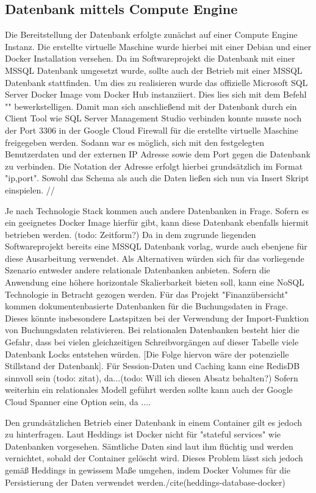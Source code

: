 \documentclass[pdftex,a4paper,abstracton,11pt,parskip=half,bibtotocnumbered]{scrartcl}
\begin{document}
	\subsection{Datenbank mittels Compute Engine}
		Die Bereitstellung der Datenbank erfolgte zunächst auf einer Compute Engine Instanz. Die erstellte virtuelle Maschine wurde hierbei mit einer Debian und einer Docker Installation versehen. Da im Softwareprojekt die Datenbank mit einer MSSQL Datenbank umgesetzt wurde, sollte auch der Betrieb mit einer MSSQL Datenbank stattfinden. Um dies zu realisieren wurde das offizielle Microsoft SQL Server Docker Image vom Docker Hub instanziiert. Dies lies sich mit dem Befehl "" bewerkstelligen. Damit man sich anschließend mit der Datenbank durch ein Client Tool wie SQL Server Management Studio verbinden konnte musste noch der Port 3306 in der Google Cloud Firewall für die erstellte virtuelle Maschine freigegeben werden. Sodann war es möglich, sich mit den festgelegten Benutzerdaten und der externen IP Adresse sowie dem Port gegen die Datenbank zu verbinden. Die Notation der Adresse erfolgt hierbei grundsätzlich im Format "ip,port". Sowohl das Schema als auch die Daten ließen sich nun via Insert Skript einspielen. //
		
		
		Je nach Technologie Stack kommen auch andere Datenbanken in Frage. Sofern es ein geeignetes Docker Image hierfür gibt, kann diese Datenbank ebenfalls hiermit betrieben werden. (todo: Zeitform?) Da in dem zugrunde liegenden Softwareprojekt bereits eine MSSQL Datenbank vorlag, wurde auch ebenjene für diese Ausarbeitung verwendet. Als Alternativen würden sich für das vorliegende Szenario entweder andere relationale Datenbanken anbieten. Sofern die Anwendung eine höhere horizontale Skalierbarkeit bieten soll, kann eine NoSQL Technologie in Betracht gezogen werden. Für das Projekt "Finanzübersicht" kommen dokumentenbasierte Datenbanken für die Buchungsdaten in Frage. Dieses könnte insbesondere Lastspitzen bei der Verwendung der Import-Funktion von Buchungsdaten relativieren. Bei relationalen Datenbanken besteht hier die Gefahr, dass bei vielen gleichzeitigen Schreibvorgängen auf dieser Tabelle viele Datenbank Locks entstehen würden. [Die Folge hiervon wäre der potenzielle Stillstand der Datenbank]. Für Session-Daten und Caching kann eine RedisDB sinnvoll sein (todo: zitat), da...(todo: Will ich diesen Absatz behalten?) Sofern weiterhin ein relationales Modell geführt werden sollte kann auch der Google Cloud Spanner eine Option sein, da .... 
		
		Den grundsätzlichen Betrieb einer Datenbank in einem Container gilt es jedoch zu hinterfragen. Laut Heddings ist Docker nicht für "stateful services" wie Datenbanken vorgesehen. Sämtliche Daten sind laut ihm flüchtig und werden vernichtet, sobald der Container gelöscht wird. Dieses Problem lässt sich jedoch gemäß Heddings in gewissem Maße umgehen, indem Docker Volumes für die Persistierung der Daten verwendet werden./cite(heddings-database-docker) 
		
\end{document}
